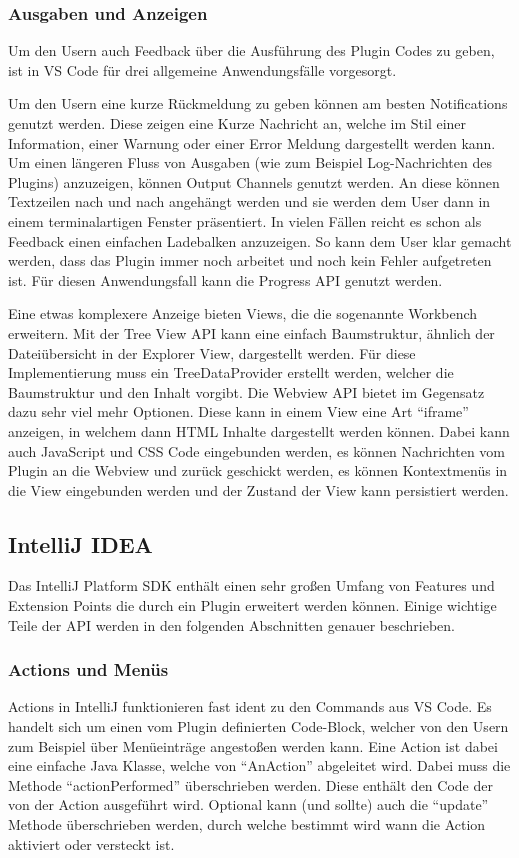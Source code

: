 \subsubsection{Ausgaben und Anzeigen}
  Um den Usern auch Feedback über die Ausführung des Plugin Codes zu geben, 
  ist in VS Code für drei allgemeine Anwendungsfälle vorgesorgt. 
  
  Um den Usern eine kurze 
  Rückmeldung zu geben können am besten Notifications genutzt werden. Diese zeigen eine Kurze 
  Nachricht an, welche im Stil einer Information, einer Warnung oder einer Error Meldung 
  dargestellt werden kann. Um einen längeren Fluss von Ausgaben (wie zum Beispiel Log-Nachrichten 
  des Plugins) anzuzeigen, können Output Channels genutzt werden. An diese können Textzeilen nach 
  und nach angehängt werden und sie werden dem User dann in einem terminalartigen Fenster präsentiert. 
  In vielen Fällen reicht es schon als Feedback einen einfachen Ladebalken anzuzeigen. So kann dem 
  User klar gemacht werden, dass das Plugin immer noch arbeitet und noch kein Fehler aufgetreten 
  ist. Für diesen Anwendungsfall kann die Progress API genutzt werden.

  Eine etwas komplexere Anzeige bieten Views, die die sogenannte Workbench erweitern.
  Mit der Tree View API kann eine einfach Baumstruktur, ähnlich der 
  Dateiübersicht in der Explorer View, dargestellt werden. Für diese Implementierung
  muss ein TreeDataProvider erstellt werden, welcher die Baumstruktur und
  den Inhalt vorgibt. Die Webview API bietet im Gegensatz dazu sehr viel mehr
  Optionen. Diese kann in einem View eine Art \enquote{iframe} anzeigen, in welchem
  dann HTML Inhalte dargestellt werden können. Dabei kann auch JavaScript und CSS Code eingebunden
  werden, es können Nachrichten vom Plugin an die Webview und zurück geschickt werden, 
  es können Kontextmenüs in die View eingebunden werden und der Zustand der View
  kann persistiert werden.

\subsection{IntelliJ IDEA}

Das IntelliJ Platform SDK enthält einen sehr großen Umfang von Features und Extension Points
die durch ein Plugin erweitert werden können. Einige wichtige Teile der API werden in den 
folgenden Abschnitten genauer beschrieben.

\subsubsection{Actions und Menüs}
  Actions in IntelliJ funktionieren fast ident zu den Commands aus VS Code. Es handelt sich um
  einen vom Plugin definierten Code-Block, welcher von den Usern zum Beispiel über Menüeinträge
  angestoßen werden kann. Eine Action ist dabei eine einfache Java Klasse, welche von \enquote{AnAction}
  abgeleitet wird. Dabei muss die Methode \enquote{actionPerformed} überschrieben werden. Diese 
  enthält den Code der von der Action ausgeführt wird. Optional kann (und sollte) auch die
  \enquote{update} Methode überschrieben werden, durch welche bestimmt wird wann die Action 
  aktiviert oder versteckt ist.

